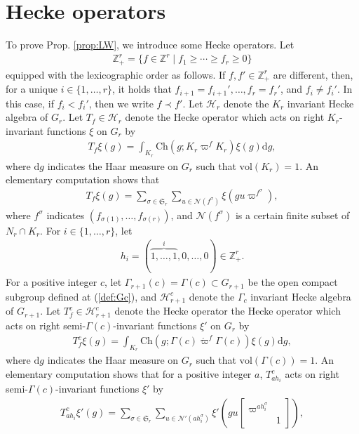 \documentclass[11pt]{amsart}
\newcommand\s{\sigma}%
\newcommand\Vp{\varpi}%
\newcommand\vp{\varphi}%
\newcommand\Sf{{\mathfrak{S}}}
\newcommand\dr{\mathrm{d}}
\newcommand\Z{{\mathbb{Z}}}
\newcommand\Nc{{\mathcal{N}}}
\newcommand\Hc{{\mathcal{H}}}
\newcommand\1{\mathbf{1}}
\newcommand\ac{\acute}
\newcommand\Ch{{\mathrm{Ch}}}%
\newcommand\vol{{\mathrm{vol}}}
\numberwithin{equation}{section}
\begin{document}
\section{Hecke operators}\label{sec:HO}
To prove Prop. \ref{prop:LW}, we introduce some Hecke operators.
Let
\begin{align*}
\Z^r_+ = \{f \in \Z^r \mid f_1 \ge \cdots \ge f_r \ge 0 \} 
\end{align*} 
equipped with the lexicographic order as follows.
If $f,f' \in \Z_+^r$ are different, then, for a unique $i \in \{1, \ldots, r\}$, it holds that $f_{i+1} = f_{i+1}', \ldots, f_r = f_r'$, and $f_i \neq f_i'$.
In this case, if $f_i < f_i'$, then we write  $f \prec f'$.
Let $\Hc_r$ denote the $K_r$ invariant Hecke algebra of $G_r$.
Let $T_f \in \Hc_r$ denote the Hecke operator which acts on right $K_r$-invariant functions $\xi$ on $G_r$ by 
\begin{align*}
T_f\xi(g) = \int_{K_r} \Ch(g; K_r \Vp^f K_r)\xi(g)\dr g, 
\end{align*} 
where $\dr g$ indicates the Haar measure on $G_r$ such that $\vol(K_r) =1$. 
An elementary computation shows that
\begin{align}
T_f\xi(g) = \sum_{\s \in \Sf_r} \sum_{u \in \Nc(f^\s)} \xi(g u \Vp^{f^{\s}}), \label{eq:Tfxi}
\end{align} 
where $f^\s$ indicates $(f_{\s(1)}, \ldots, f_{\s(r)})$, and $\Nc(f^\s)$ is a certain finite subset of $N_r \cap K_r$.
For $i \in \{1, \ldots, r \}$, let 
\begin{align*}
h_i = (\overbrace{1, \ldots, 1}^{i}, 0, \ldots, 0) \in \Z_+^r. 
\end{align*} 
For a positive integer $c$, let $\Gamma_{r+1}(c) = \Gamma(c) \subset G_{r+1}$ be the open compact subgroup defined at (\ref{def:Gc}), and $\Hc_{r+1}^c$ denote the $\Gamma_c$ invariant Hecke algebra of $G_{r+1}$.
Let $T_f^c \in \Hc_{r+1}^c$ denote the Hecke operator the Hecke operator which acts on right semi-$\Gamma(c)$-invariant functions $\xi'$ on $G_r$ by 
\begin{align*}
T_f^c \xi(g) = \int_{K_r} \Ch(g; \Gamma(c) \ac{\Vp}^f \Gamma(c))\xi(g)\dr g, 
\end{align*} 
where $\dr g$ indicates the Haar measure on $G_r$ such that $\vol(\Gamma(c)) =1$. 
An elementary computation shows that for a positive integer $a$, $T_{ah_i}^c$ acts on right semi-$\Gamma(c)$-invariant functions $\xi'$ by
\begin{align}
T_{ah_i}^c \xi'(g) = \sum_{\s \in \Sf_r} \sum_{u \in \Nc'(ah_i^\s)}\xi'(gu \begin{bmatrix}
\Vp^{ah_i^\s} &  \\
& 1
\end{bmatrix}), \label{eq:Thi}
\end{align} 
\end{document}
